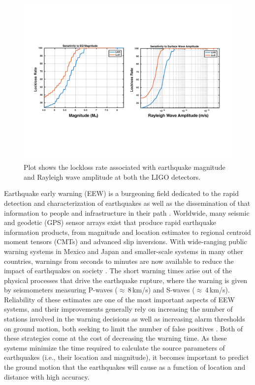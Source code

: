 \documentclass[twocolumn, aps, superscriptaddress]{revtex4}
\begin{document}
\begin{figure}[!htb]
  \includegraphics[width=\textwidth]{./plots/Lockloss_Sensitivity.pdf}
 \caption{Plot shows the lockloss rate associated with earthquake magnitude and Rayleigh wave amplitude at both the LIGO detectors.}
 \label{fig:lockloss_sensitivity}
\end{figure}


Earthquake early warning (EEW) is a burgeoning field dedicated to the rapid detection and characterization of earthquakes as well as the dissemination of that information to people and infrastructure in their path \cite{Al2012,KuAl2013a,KuAl2013b,KuHe2014,CoLa2009a,CoLa2009b,BoAl2014,HoKa2008,HoEA2011c,StAl2016}.
Worldwide, many seismic and geodetic (GPS) sensor arrays exist that produce rapid earthquake information products, from magnitude and location estimates to regional centroid moment tensors (CMTs) and advanced slip inversions.
With wide-ranging public warning systems in Mexico and Japan and smaller-scale systems in many other countries, warnings from seconds to minutes are now available to reduce the impact of earthquakes on society \cite{StAl2016}.
The short warning times arise out of the physical processes that drive the earthquake rupture, where the warning is given by seismometers measuring P-waves ($\approx$\,8\,km/s) and S-waves ($\approx$\,4\,km/s).
Reliability of these estimates are one of the most important aspects of EEW systems, and their improvements generally rely on increasing the number of stations involved in the warning decisions as well as increasing alarm thresholds on ground motion, both seeking to limit the number of false positives \cite{KuCo2015}. Both of these strategies come at the cost of decreasing the warning time. 
As these systems minimize the time required to calculate the source parameters of earthquakes (i.e., their location and magnitude), it becomes important to predict the ground motion that the earthquakes will cause as a function of location and distance with high accuracy.
\end{document}
